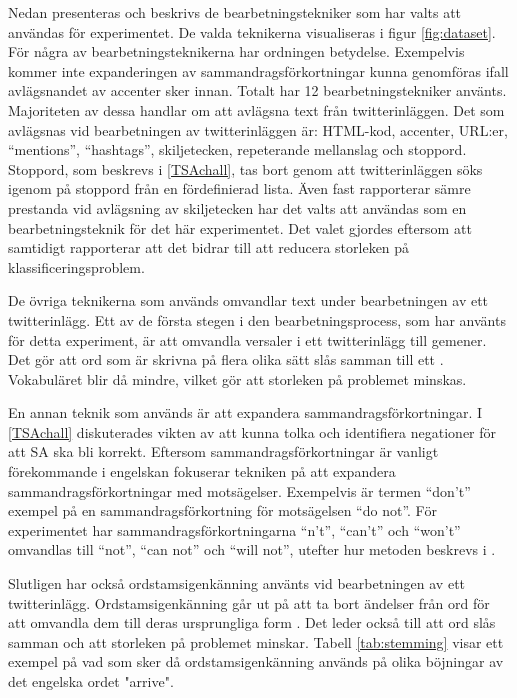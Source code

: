 \documentclass{kaumasters} %
\begin{document}
Nedan presenteras och beskrivs de bearbetningstekniker som har valts att användas för experimentet. De valda teknikerna visualiseras i figur \ref{fig:dataset}. För några av bearbetningsteknikerna har ordningen betydelse. Exempelvis kommer inte expanderingen av sammandragsförkortningar kunna genomföras ifall avlägsnandet av accenter sker innan. Totalt har 12 bearbetningstekniker använts. Majoriteten av dessa handlar om att avlägsna text från twitterinläggen. Det som avlägsnas vid bearbetningen av twitterinläggen är: HTML-kod, accenter, URL:er, “mentions”, “hashtags”, skiljetecken, repeterande mellanslag och stoppord. Stoppord, som beskrevs i \ref{TSAchall}, tas bort genom att twitterinläggen söks igenom på stoppord från en fördefinierad lista. Även fast \cite{effrosynidis2017comparison} rapporterar sämre prestanda vid avlägsning av skiljetecken har det valts att användas som en bearbetningsteknik för det här experimentet. Det valet gjordes eftersom att \cite{effrosynidis2017comparison} samtidigt rapporterar att det bidrar till att reducera storleken på klassificeringsproblem. 

De övriga teknikerna som används omvandlar text under bearbetningen av ett twitterinlägg. Ett av de första stegen i den bearbetningsprocess, som har använts för detta experiment, är att omvandla versaler i ett twitterinlägg till gemener. Det gör att ord som är skrivna på flera olika sätt slås samman till ett \cite{effrosynidis2017comparison}. Vokabuläret blir då mindre, vilket gör att storleken på problemet minskas.

En annan teknik som används är att expandera sammandragsförkortningar.  I \ref{TSAchall} diskuterades vikten av att kunna tolka och identifiera negationer för att SA ska bli korrekt. Eftersom sammandragsförkortningar är vanligt förekommande i engelskan fokuserar tekniken på att expandera sammandragsförkortningar med motsägelser. Exempelvis är termen “don’t” exempel på en sammandragsförkortning för motsägelsen “do not”. För experimentet har sammandragsförkortningarna “n’t”, “can’t” och “won’t” omvandlas till “not”, “can not” och “will not”, utefter hur metoden beskrevs i \cite{7862202}.

Slutligen har också ordstamsigenkänning använts vid bearbetningen av ett twitterinlägg. Ordstamsigenkänning går ut på att ta bort ändelser från ord för att omvandla dem till deras ursprungliga form \cite{effrosynidis2017comparison}. Det leder också till att ord slås samman och att storleken på problemet minskar. Tabell \ref{tab:stemming} visar ett exempel på vad som sker då ordstamsigenkänning används på olika böjningar av det engelska ordet "arrive".
\end{document}
